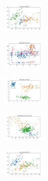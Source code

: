 \begin{figure}[H]    
    \centering
    \begin{subfigure}
        \centering
        \includegraphics[width=0.234\textwidth]{img/copkm2/iris_set_const_20_949004259_clust.png}
    \end{subfigure}
    \hfill
    \begin{subfigure}
        \centering
        \includegraphics[width=0.234\textwidth]{img/copkm2/ecoli_set_const_20_949004259_clust.png}
    \end{subfigure}
    \hfill
    \begin{subfigure}
        \centering
        \includegraphics[width=0.234\textwidth]{img/copkm2/rand_set_const_20_949004259_clust.png}
    \end{subfigure}
    \hfill
    \begin{subfigure}
        \centering
        \includegraphics[width=0.234\textwidth]{img/copkm2/newthyroid_set_const_20_949004259_clust.png}
    \end{subfigure}
    \hfill
    \begin{subfigure}
        \centering
        \includegraphics[width=0.234\textwidth]{img/copkm2/iris_set_const_20_589741062_clust.png}
    \end{subfigure}

\end{figure}
